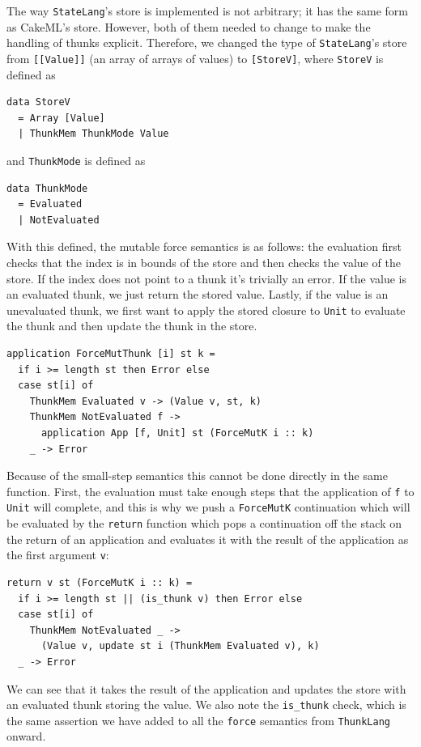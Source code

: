 \documentclass[sigconf]{acmart}
\newcommand{\hsinl}[1]{\texttt{#1}}
\newcommand{\code}[1]{\texttt{#1}}
\newcommand{\ThunkLang}{\code{ThunkLang}}
\newcommand{\StateLang}{\code{StateLang}}
\begin{document}
The way \StateLang{}'s store is implemented is not arbitrary; it has the same
form as CakeML's store. However, both of them needed to change to make the
handling of thunks explicit. Therefore, we changed the type of
\StateLang{}'s store from \hsinl{[[Value]]} (an array of arrays of values) to
\hsinl{[StoreV]}, where \hsinl{StoreV} is defined as
\begin{verbatim}
data StoreV
  = Array [Value]
  | ThunkMem ThunkMode Value
\end{verbatim}
and \hsinl{ThunkMode} is defined as
\begin{verbatim}
data ThunkMode
  = Evaluated
  | NotEvaluated
\end{verbatim}
With this defined, the mutable force semantics is as follows: the evaluation
first checks that the index is in bounds of the store and then checks the value
of the store. If the index does not point to a thunk it's trivially an error. If
the value is an evaluated thunk, we just return the stored value. Lastly, if the
value is an unevaluated thunk, we first want to apply the stored closure to
\hsinl{Unit} to evaluate the thunk and then update the thunk in the store.
\begin{verbatim}
application ForceMutThunk [i] st k =
  if i >= length st then Error else
  case st[i] of
    ThunkMem Evaluated v -> (Value v, st, k)
    ThunkMem NotEvaluated f ->
      application App [f, Unit] st (ForceMutK i :: k)
    _ -> Error
\end{verbatim}
Because of the small-step semantics this cannot be done directly in the same
function. First, the evaluation must take enough steps that the application of
\code{f} to \hsinl{Unit} will complete, and this is why we push a
\hsinl{ForceMutK} continuation which will be evaluated by the \hsinl{return}
function which pops a continuation off the stack on the return of an application
and evaluates it with the result of the application as the first argument
\code{v}:
\begin{verbatim}
return v st (ForceMutK i :: k) =
  if i >= length st || (is_thunk v) then Error else
  case st[i] of
    ThunkMem NotEvaluated _ ->
      (Value v, update st i (ThunkMem Evaluated v), k)
  _ -> Error
\end{verbatim}
We can see that it takes the result of the application and updates the store
with an evaluated thunk storing the value. We also note the \code{is\_thunk}
check, which is the same assertion we have added to all the \code{force}
semantics from \ThunkLang{} onward.
\end{document}

